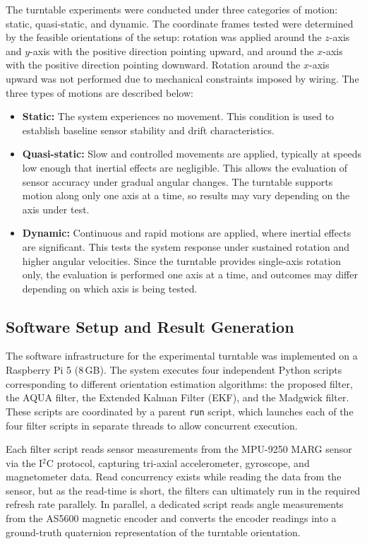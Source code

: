 \documentclass{iutbscthesis}
\begin{document}
The turntable experiments were conducted under three categories of motion: static, quasi-static, and dynamic\cite{godwin2009accuracy}. The coordinate frames tested were determined by the feasible orientations of the setup: rotation was applied around the $z$-axis and $y$-axis with the positive direction pointing upward, and around the $x$-axis with the positive direction pointing downward. Rotation around the $x$-axis upward was not performed due to mechanical constraints imposed by wiring. The three types of motions are described below:
\begin{itemize}
    \item \textbf{Static:} The system experiences no movement. This condition is used to establish baseline sensor stability and drift characteristics.
    
    \item \textbf{Quasi-static:} Slow and controlled movements are applied, typically at speeds low enough that inertial effects are negligible. This allows the evaluation of sensor accuracy under gradual angular changes. The turntable supports motion along only one axis at a time, so results may vary depending on the axis under test.

    \item \textbf{Dynamic:} Continuous and rapid motions are applied, where inertial effects are significant. This tests the system response under sustained rotation and higher angular velocities. Since the turntable provides single-axis rotation only, the evaluation is performed one axis at a time, and outcomes may differ depending on which axis is being tested.
    
    
\end{itemize}

\subsection{Software Setup and Result Generation}

The software infrastructure for the experimental turntable was implemented on a Raspberry Pi 5 (8\,GB). The system executes four independent Python scripts corresponding to different orientation estimation algorithms: the proposed filter, the AQUA filter, the Extended Kalman Filter (EKF), and the Madgwick filter. These scripts are coordinated by a parent \texttt{run} script, which launches each of the four filter scripts in separate threads to allow concurrent execution.

Each filter script reads sensor measurements from the MPU-9250 MARG sensor via the I$^2$C protocol, capturing tri-axial accelerometer, gyroscope, and magnetometer data. Read concurrency exists while reading the data from the sensor, but as the read-time is short, the filters can ultimately run in the required refresh rate parallely. In parallel, a dedicated script reads angle measurements from the AS5600 magnetic encoder and converts the encoder readings into a ground-truth quaternion representation of the turntable orientation.
\end{document}
